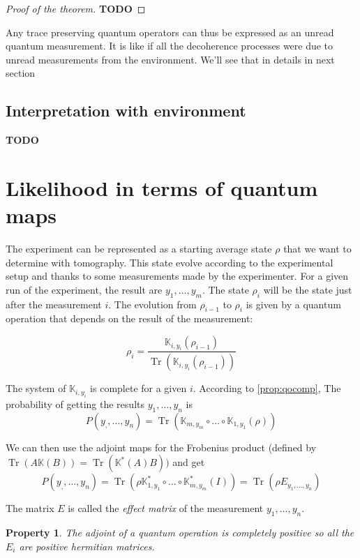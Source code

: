 \documentclass[10pt]{report}
\theoremstyle{plain}
\newtheorem{prop}[thm]{Property}
\theoremstyle{definition}
\theoremstyle{remark}
\newcommand{\TODO}{\textbf{TODO}}
\DeclareMathOperator{\Tr}{Tr}
\newcommand{\trnorm}[1]{\frac{#1}{\Tr\left({#1}\right)}}
\begin{document}
\begin{proof}[Proof of the theorem]
  \TODO{}
\end{proof}

Any trace preserving quantum operators can thus be expressed as an unread
quantum measurement. It is like if all the decoherence processes were due to unread
measurements from the environment. We'll see that in details in next section

\subsection{Interpretation with environment}\label{ssec:interp}

\TODO{}

\section{Likelihood in terms of quantum maps}

The experiment can be represented as a starting average state $\rho$ that we
want to determine with tomography. This state evolve according to the
experimental setup and thanks to some measurements made by the experimenter. For
a given run of the experiment, the result are $y_1,\ldots,y_m$.
The state $\rho_i$ will be the state just after the measurement $i$. The
evolution from $\rho_{i-1}$ to $\rho_i$ is given by a quantum operation that
depends on the result of the measurement:

\[\rho_i = \trnorm{\mathbb K_{i,y_i}(\rho_{i-1})}\]

The system of $\mathbb K_{i,y_i}$ is complete for a given $i$. According to
\cref{prop:qocomp}, The probability of getting the results $y_1, \ldots, y_n$ is
\[P(y_,,\ldots, y_n) = \Tr(\mathbb K_{m,y_m} \circ \ldots \circ \mathbb K_{1,y_1}(\rho))\]

We can then use the adjoint maps for the Frobenius product (defined by $\Tr(A\mathbb K(B)) = \Tr(\mathbb
K^*(A)B))$ and get
\[P(y_,,\ldots, y_n) = \Tr(\rho \mathbb K_{1,y_1}^* \circ \ldots \circ \mathbb
  K_{m,y_m}^*(I)) = \Tr(\rho E_{y_1,\ldots, y_n})\]

The matrix $E$ is called the \emph{effect matrix} of the measurement
$y_1,\ldots,y_n$.

\begin{prop}
  The adjoint of a quantum operation is completely positive so all the $E_i$ are
  positive hermitian matrices.
\end{prop}
\end{document}
